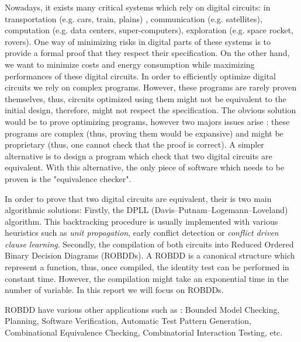 \documentclass[a4paper,10pt]{article}
\begin{document}
Nowadays, it exists many critical systems which rely on digital circuits: in transportation (e.g. cars, train, plains) , communication (e.g. satellites), computation (e.g. data centers, super-computers), exploration (e.g. space rocket, rovers).
One way of minimizing risks in digital parts of these systems is to provide a formal proof that they respect their specification.
On the other hand, we want to minimize costs and energy consumption while maximizing performances of these digital circuits.
In order to efficiently optimize digital circuits we rely on complex programs.
However, these programs are rarely proven themselves, thus, circuits optimized using them might not be equivalent to the initial design, therefore, might not respect the specification.
The obvious solution would be to prove optimizing programs, however two majors issues arise : these programs are complex  (thus, proving them would be expansive) and might be proprietary (thus, one cannot check that the proof is correct).
A simpler alternative is to design a program which check that two digital circuits are equivalent.
With this alternative, the only piece of software which needs to be proven is the "equivalence checker".


In order to prove that two digital circuits are equivalent, their is two main algorithmic solutions:
Firstly, the DPLL (Davis–Putnam–Logemann–Loveland) algorithm.
This backtracking procedure is usually implemented with various heuristics such as \textit{unit propagation}, early conflict detection or \textit{conflict driven clause learning}.
Secondly, the compilation of both circuits into Reduced Ordered Binary Decision Diagrams (ROBDDs).
A ROBDD is a canonical structure which represent a function, thus, once compiled, the identity test can be performed in constant time.
However, the compilation might take an exponential time in the number of variable.
In this report we will focus on ROBDDs.


ROBDD have various other applications such as : Bounded Model Checking, Planning, Software Verification, Automatic Test Pattern Generation, Combinational Equivalence Checking, Combinatorial Interaction Testing, etc.

\end{document}

